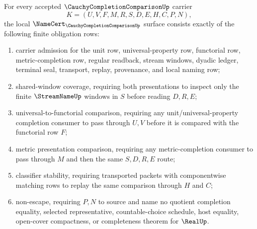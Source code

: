 \begin{theorem}
\label{thm:cauchy-completion-comparison-namecert-obligations}
For every accepted $\CauchyCompletionComparisonUp$ carrier
$$
K=(U,V,F,M,R,S,D,E,H,C,P,N),
$$
the local $\NameCert_{\CauchyCompletionComparisonUp}$ surface consists exactly of the following finite obligation rows:
\begin{enumerate}
\item carrier admission for the unit row, universal-property row, functorial row, metric-completion row, regular readback, stream windows, dyadic ledger, terminal seal, transport, replay, provenance, and local naming row;
\item shared-window coverage, requiring both presentations to inspect only the finite $\StreamNameUp$ windows in $S$ before reading $D,R,E$;
\item universal-to-functorial comparison, requiring any unit/universal-property completion consumer to pass through $U,V$ before it is compared with the functorial row $F$;
\item metric presentation comparison, requiring any metric-completion consumer to pass through $M$ and then the same $S,D,R,E$ route;
\item classifier stability, requiring transported packets with componentwise matching rows to replay the same comparison through $H$ and $C$;
\item non-escape, requiring $P,N$ to source and name no quotient completion equality, selected representative, countable-choice schedule, host equality, open-cover compactness, or completeness theorem for $\RealUp$.
\end{enumerate}
\end{theorem}
